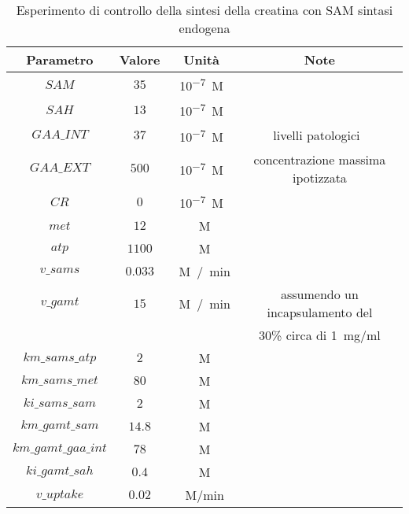 \begin{table}[H]
	\centering
	\begin{tabular}{| c | c | c | c |}
	\hline
	Parametro & Valore & Unit\`a & Note \\
		\hline
		$SAM$ & $35$ & \si{10^{-7} M} & \\
		\hline
		$SAH$ & $13$ & \si{10^{-7} M} & \\
		\hline
		$GAA\_INT$ & $37$ & \si{10^{-7} M} & livelli patologici~\cite{kikuchi1981liquid} \\
		\hline
		$GAA\_EXT$ & $500$ & \si{10^{-7} M} & concentrazione massima ipotizzata \\
		\hline
		$CR$ & $0$ & \si{10^{-7} M} & \\
		\hline
		$met$ & $12$ & \si{\mu M} & \\
		\hline
		$atp$ & $1100$ & \si{\mu M} & \\
		\hline
		$v\_sams$ & $0.033$ & \si{\mu M / min} & \\
		\hline
		$v\_gamt$ & $15$ & \si{\mu M / min} & assumendo un incapsulamento del \\&&&30\% circa di \SI{1}{mg/ml} \\
		\hline
		$km\_sams\_atp$ & $2$ & \si{\mu M} & \\
		\hline
		$km\_sams\_met$ & $80$ & \si{\mu M} & \\
		\hline
		$ki\_sams\_sam$ & $2$ & \si{\mu M} & \\
		\hline
		$km\_gamt\_sam$ & $14.8$ & \si{\mu M} & \\
		\hline
		$km\_gamt\_gaa\_int$ & $78$ & \si{\mu M} & \\
		\hline
		$ki\_gamt\_sah$ & $0.4$ & \si{\mu M} & \\
		\hline
		$v\_uptake$ & $0.02$ & \si{\mu M/min} & \\
		\hline
	\end{tabular}
	\caption{Esperimento di controllo della sintesi della creatina con SAM sintasi endogena}
	\label{mod:8}
\end{table}

